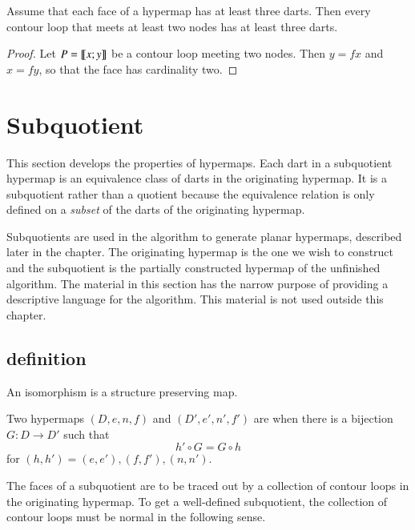 \begin{lemma}\cutrate{}\label{lemma:3dart}  
Assume that each face of a hypermap  has at least three darts.
Then every contour loop that meets at least two nodes has at least
three darts.
\end{lemma}

\begin{proof} Let $P={\llbracket{x;y}\rrbracket}$ be a contour loop meeting two nodes.  Then
$y = f x$ and $x = f y$, so that the face has cardinality two.
\end{proof}


\section{Subquotient}
%

This section develops the properties of 
  hypermaps.  Each dart in a subquotient hypermap is an equivalence
class of darts in the originating hypermap.  It is a subquotient
rather than a quotient because the equivalence relation
is only defined on a {\it subset} of the darts of the originating
hypermap. 

Subquotients are used in the algorithm to generate planar hypermaps, described
later in the chapter.  The
originating hypermap is the one we wish to construct and the subquotient
is the partially constructed hypermap of the unfinished algorithm.  The material
in this section has the narrow purpose  of providing a descriptive language for the
algorithm.  This material  is not  used outside this chapter.

\subsection{definition}

An isomorphism is a structure preserving map.

\begin{definition}[isomorphism]
 Two hypermaps $(D,e,n,f)$ and
$(D',e',n',f')$ are  
when there is a bijection
$G:D\to D'$ such that
\[ h'\circ G = G\circ h\] 
for $(h,h')=(e,e'), (f,f'), (n,n')$.
%
\end{definition}

The faces of a subquotient are to be traced out by a collection of contour loops
in the originating hypermap.  To get a well-defined subquotient, the collection
of contour loops must be normal in the following sense.

